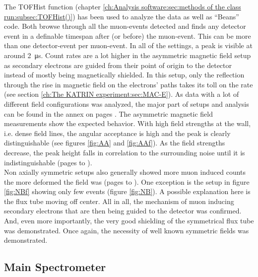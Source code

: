   	
  The TOFHist function (chapter \ref{ch:Analysis software:sec:methods of the class run:subsec:TOFHist()}) has been used to analyze the data as well as ``Beans'' code.
  Both browse through all the muon-events detected and finds any detector event in a definable timespan after (or before) the muon-event. This can be more than one detector-event per muon-event. In all of the settings, a peak is visible at around \SI{2}{\micro\second}. Count rates are a lot higher in the asymmetric magnetic field setup as secondary electrons are guided from their point of origin to the detector instead of mostly being magnetically shielded. In this setup, only the reflection through the rise in magnetic field on the electrons' paths takes its toll on the rate (see section \ref{ch:The KATRIN experiment:sec:MAC-E}).
  As data with a lot of different field configurations was analyzed, the major part of setups and analysis can be found in the annex on pages \pageref{ch:annex:sec:A3}.
  The asymmetric magnetic field measurements show the expected behavior. With high field strengths at the wall, i.e. dense field lines, the angular acceptance is high and the peak is clearly distinguishable (see figures \ref{fig:AA} and \ref{fig:AAf}). As the field strengths decrease, the peak height falls in correlation to the surrounding noise until it is indistinguishable (pages \pageref{fig:ABf} to \pageref{fig:AD}).\\
  Non axially symmetric setups also generally showed more muon induced counts the more deformed the field was (pages \pageref{fig:NAf} to \pageref{fig:ND}). One exception is the setup in figure \ref{fig:NBf} showing only few events (figure \ref{fig:NB}). A possible explanation here is the flux tube moving off center.
  All in all, the mechanism of muon inducing secondary electrons that are then being guided to the detector was confirmed. And, even more importantly, the very good shielding of the symmetrical flux tube was demonstrated. Once again, the necessity of well known symmetric fields was demonstrated.
  
  
  \subsection{Main Spectrometer}
  \label{ch:Analysis:sec:Monitor Spectrometer Measurements:subsec:Main Spectrometer}
  
